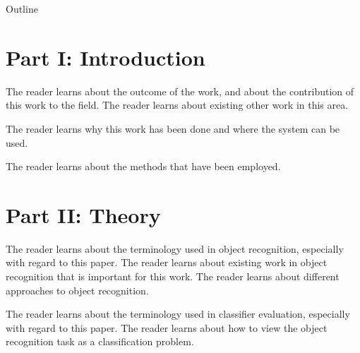 \clearemptydoublepage


\begin{center}
	\huge{Outline}
\end{center}

\section*{Part I: Introduction}

  \vspace{1mm}

The reader learns about the outcome of the work, and about the contribution of
this work to the field. The reader learns about existing other work in this
area.

  \vspace{1mm}

The reader learns why this work has been done and where the system can be used.

  \vspace{1mm}

The reader learns about the methods that have been employed.

\section*{Part II: Theory}

  \vspace{1mm}

The reader learns about the terminology used in object recognition,
especially with regard to this paper. The reader learns about existing work in
object recognition that is important for this work. The reader learns about
different approaches to object recognition.

  \vspace{1mm}

The reader learns about the terminology used in classifier evaluation,
especially with regard to this paper. The reader learns about how to view
the object recognition task as a classification problem. 

